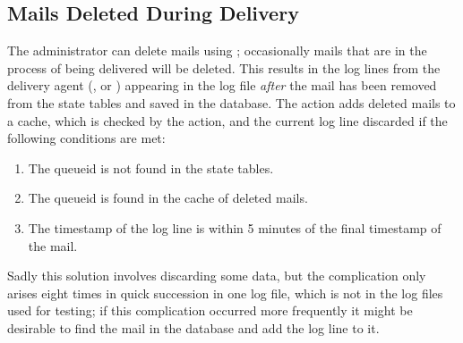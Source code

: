 \subsection{Mails Deleted During Delivery}

\label{Mails deleted during delivery}

The administrator can delete mails using ; occasionally
mails that are in the process of being delivered will be deleted.  This
results in the log lines from the delivery agent (,
 or ) appearing in the log file
\textit{after\/} the mail has been removed from the state tables and saved
in the database.  The  action adds deleted mails to a cache,
which is checked by the  action, and the current log
line discarded if the following conditions are met:

\begin{enumerate}

    \item The queueid is not found in the state tables.

    \item The queueid is found in the cache of deleted mails.

    \item The timestamp of the log line is within 5 minutes of the final
        timestamp of the mail.

\end{enumerate}

Sadly this solution involves discarding some data, but the complication
only arises eight times in quick succession in one log file, which is not
in the \numberOFlogFILES{} log files used for testing; if this complication
occurred more frequently it might be desirable to find the mail in the
database and add the log line to it.

